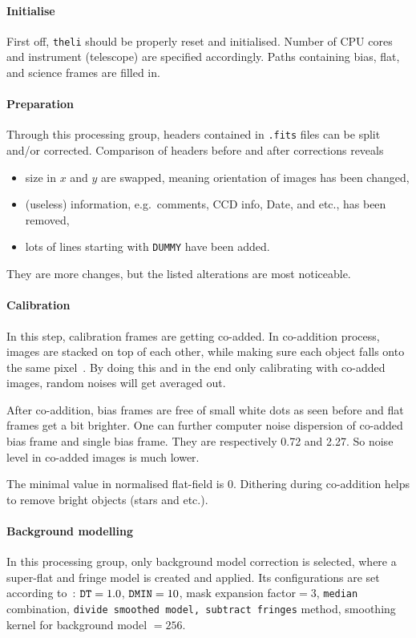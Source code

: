 \paragraph{Initialise}  First off, \verb|theli| should be properly reset and initialised. Number of CPU cores and instrument (telescope) are specified accordingly. Paths containing bias, flat, and science frames are filled in.

\paragraph{Preparation}
Through this processing group, headers contained in \verb|.fits| files can be split and/or corrected. Comparison of headers before and after corrections reveals
\begin{itemize}
   \item size in $x$ and $y$ are swapped, meaning orientation of images has been changed,
   \item (useless) information, e.g.~comments, CCD info, Date, and etc., has been removed,
   \item lots of lines starting with \verb|DUMMY| have been added.
\end{itemize}
They are more changes, but the listed alterations are most noticeable.

\paragraph{Calibration}
In this step, calibration frames are getting co-added. In co-addition process, images are stacked on top of each other, while making sure each object falls onto the same pixel~\cite{manual}. By doing this and in the end only calibrating with co-added images, random noises will get averaged out.  

After co-addition, bias frames are free of small white dots as seen before and flat frames get a bit brighter. One can further computer noise dispersion of co-added bias frame and single bias frame. They are respectively \num{0.72} and \num{2.27}. So noise level in co-added images is much lower.

The minimal value in normalised flat-field is $0$. Dithering during co-addition helps to remove bright objects (stars and etc.).

\paragraph{Background modelling}
In this processing group, only background model correction is selected, where a super-flat and fringe model is created and applied. Its configurations are set according to~\cite{manual}: $\verb|DT| = 1.0$, $\verb|DMIN|=10$, mask expansion factor$=3$, \verb|median| combination, \verb|divide smoothed model, subtract fringes| method, smoothing kernel for background model $=256$.

